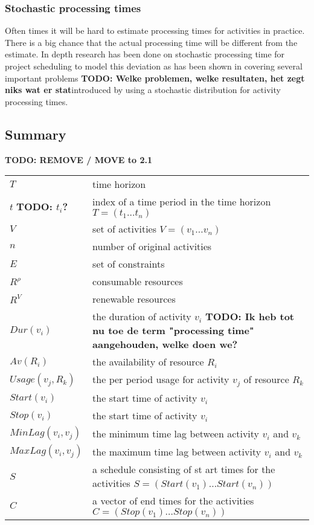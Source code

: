 \documentclass{article}
\newcommand{\TODO}[1]{{\color{red}\textbf{TODO: #1}}}
\begin{document}
\subsubsection{Stochastic processing times}
Often times it will be hard to estimate processing times for activities in practice.
There is a big chance that the actual processing time will be  different from the estimate.
In depth research has been done on stochastic processing time for project scheduling to model this deviation as has been shown in \cite{brucker99} covering several important problems \TODO{Welke problemen, welke resultaten, het zegt niks wat er stat}introduced by using a stochastic distribution for activity processing times.

\subsection{Summary}
\TODO{REMOVE / MOVE to 2.1}
\begin{tabular}{l l}
\hline
$T$ & time horizon \\
$t$ \TODO{$t_i$?} &  index of a time period in the time horizon $T = (t_1 \ldots t_n)$\\
$V$ & set of activities $V = (v_1 \ldots v_n)$ \\
$n$ & number of original activities \\
$E$ & set of constraints \\
$R^{\rho}$ & consumable resources \\
$R^V$ & renewable resources \\
$Dur(v_i)$ & the duration of activity $v_i$ \TODO{Ik heb tot nu toe de term "processing time" aangehouden, welke doen we?}\\
$Av(R_i)$ & the availability of resource $R_i$ \\
$Usage(v_j, R_k)$ & the per period usage for activity $v_j$ of resource $R_k$ \\
$Start(v_i)$ & the start time of activity $v_i$ \\
$Stop(v_i)$ & the start time of activity $v_i$ \\
$MinLag(v_i, v_j)$ & the minimum time lag between activity $v_i$ and $v_k$ \\
$MaxLag(v_i, v_j)$ & the maximum time lag between activity $v_i$ and $v_k$ \\
$S$ & a schedule consisting of st
art times for the activities $S = (Start(v_1) \ldots Start(v_n))$ \\
$C$ & a vector of end times for the activities $C = (Stop(v_1) \ldots Stop(v_n))$ \\
\hline
\end{tabular}
\end{document}

